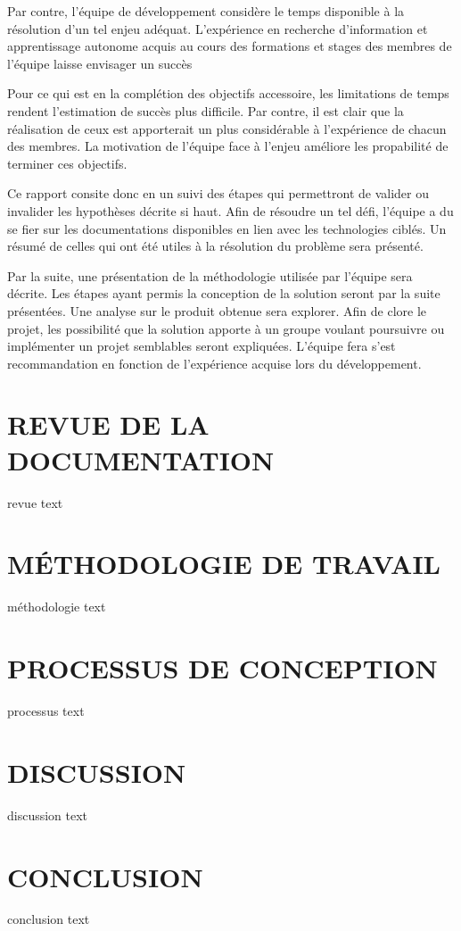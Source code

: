 \documentclass[letterpaper,twoside,12pt,french]{report}
\begin{document}
\par
Par contre, l'équipe de développement considère le temps disponible à la résolution d'un tel enjeu
adéquat. L'expérience en recherche d'information et apprentissage autonome acquis au cours des
formations et stages des membres de l'équipe laisse envisager un succès
\par
Pour ce qui est en la complétion des objectifs accessoire, les limitations de temps rendent
l'estimation de succès plus difficile. Par contre, il est clair que la réalisation de ceux est
apporterait un plus considérable à l'expérience de chacun des membres. La motivation de l'équipe
face à l'enjeu améliore les propabilité de terminer ces objectifs.
\par
Ce rapport consite donc en un suivi des étapes qui permettront de valider ou invalider les
hypothèses décrite si haut. Afin de résoudre un tel défi, l'équipe a du se fier sur les
documentations disponibles en lien avec les technologies ciblés. Un résumé de celles qui ont été
utiles à la résolution du problème sera présenté.
\par
Par la suite, une présentation de la méthodologie utilisée par l'équipe sera décrite. Les étapes
ayant permis la conception de la solution seront par la suite présentées. Une analyse sur le produit
obtenue sera explorer. Afin de clore le projet, les possibilité que la solution apporte à un groupe voulant poursuivre ou
implémenter un projet semblables seront expliquées. L'équipe fera s'est recommandation en fonction
de l'expérience acquise lors du développement.
\chapter*{\uppercase{Revue de la documentation}}
revue text
\chapter*{\uppercase{Méthodologie de travail}}
méthodologie text
\chapter*{\uppercase{Processus de conception}}
processus text
\chapter*{\uppercase{Discussion}}
discussion text
\chapter*{\uppercase{Conclusion}}
conclusion text
\end{document}
